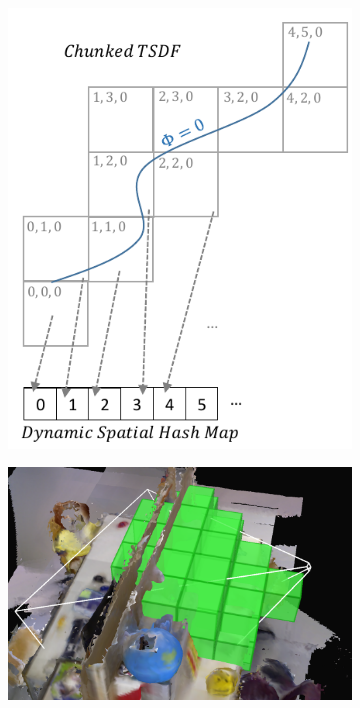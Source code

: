 \begin{figure}
  \centering
  	\begin{subfigure}{0.48\columnwidth} \centering
    \includegraphics[width=1.0\textwidth]{img/chunks.pdf}
      \caption{}
  	\label{fig:chunks} 
  \end{subfigure} 
  \begin{subfigure}{0.48\columnwidth} \centering
      \includegraphics[width=1.0\textwidth]{img/frustum_cull}

\end{subfigure}
\end{figure}
